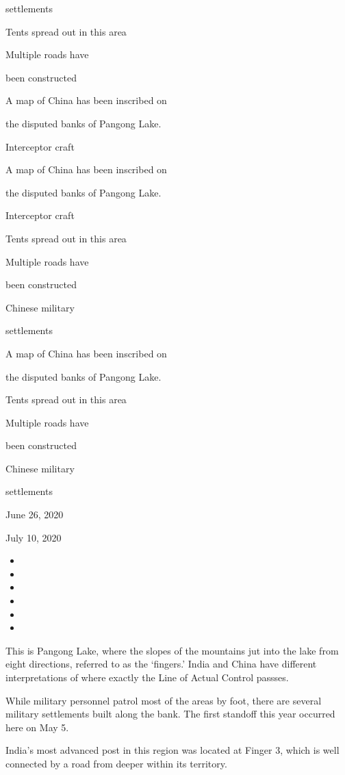 settlements

Tents spread out in this area

Multiple roads have

been constructed

A map of China has been inscribed on

the disputed banks of Pangong Lake.

Interceptor craft

A map of China has been inscribed on

the disputed banks of Pangong Lake.

Interceptor craft

Tents spread out in this area

Multiple roads have

been constructed

Chinese military

settlements

A map of China has been inscribed on

the disputed banks of Pangong Lake.

Tents spread out in this area

Multiple roads have

been constructed

Chinese military

settlements

June 26, 2020

July 10, 2020

\begin{itemize}
\item
\item
\item
\item
\item
\item
\end{itemize}

This is Pangong Lake, where the slopes of the mountains jut into the
lake from eight directions, referred to as the `fingers.' India and
China have different interpretations of where exactly the Line of Actual
Control passses.

While military personnel patrol most of the areas by foot, there are
several military settlements built along the bank. The first standoff
this year occurred here on May 5.

India's most advanced post in this region was located at Finger 3, which
is well connected by a road from deeper within its territory.

